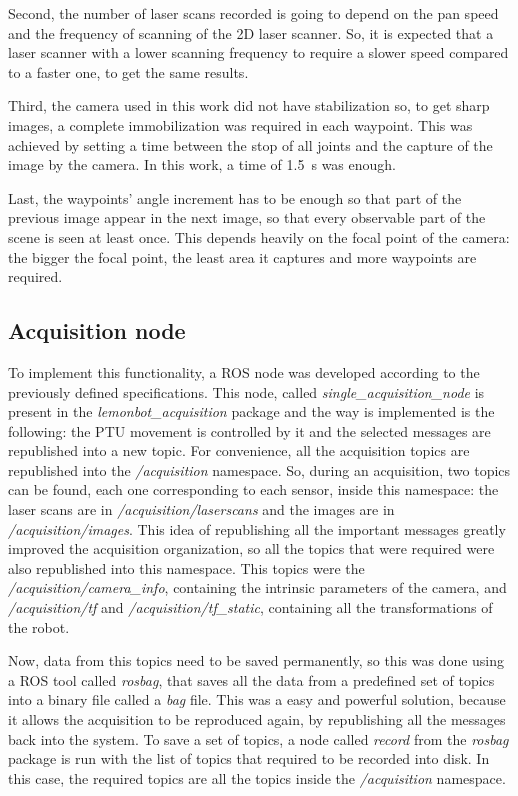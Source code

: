Second, the number of laser scans recorded is going to depend on the pan speed and the frequency of scanning of the 2D laser scanner. So, it is expected that a laser scanner with a lower scanning frequency to require a slower speed compared to a faster one, to get the same results. 
                        
Third, the camera used in this work did not have stabilization so, to get sharp images, a complete immobilization was required in each waypoint. This was achieved by setting a time between the stop of all joints and the capture of the image by the camera. In this work, a time of \SI{1.5}{\second} was enough.
                        
Last, the waypoints' angle increment has to be enough so that part of the previous image appear in the next image, so that every observable part of the scene is seen at least once. This depends heavily on the focal point of the camera: the bigger the focal point, the least area it captures and more waypoints are required.

\subsection{Acquisition node}
\label{section:acquisition-node}


To implement this functionality, a ROS node was developed according to the previously defined specifications. This node, called \emph{single\_acquisition\_node} is present in the \emph{lemonbot\_acquisition} package and the way is implemented is the following: the PTU movement is controlled by it and the selected messages are republished into a new topic. For convenience, all the acquisition topics are republished into the \emph{/acquisition} namespace. So, during an acquisition, two topics can be found, each one corresponding to each sensor, inside this namespace: the laser scans are in \emph{/acquisition/laserscans} and the images are in \emph{/acquisition/images}. This idea of republishing all the important messages greatly improved the acquisition organization, so all the topics that were required were also republished into this namespace. This topics were the \emph{/acquisition/camera\_info}, containing the intrinsic parameters of the camera, and \emph{/acquisition/tf} and \emph{/acquisition/tf\_static}, containing all the transformations of the robot.

Now, data from this topics need to be saved permanently, so this was done using a ROS tool called \emph{rosbag}, that saves all the data from a predefined set of topics into a binary file called a \emph{bag} file. This was a easy and powerful solution, because it allows the acquisition to be reproduced again, by republishing all the messages back into the system. To save a set of topics, a node called \emph{record} from the \emph{rosbag} package is run with the list of topics that required to be recorded into disk. In this case, the required topics are all the topics inside the \emph{/acquisition} namespace.


